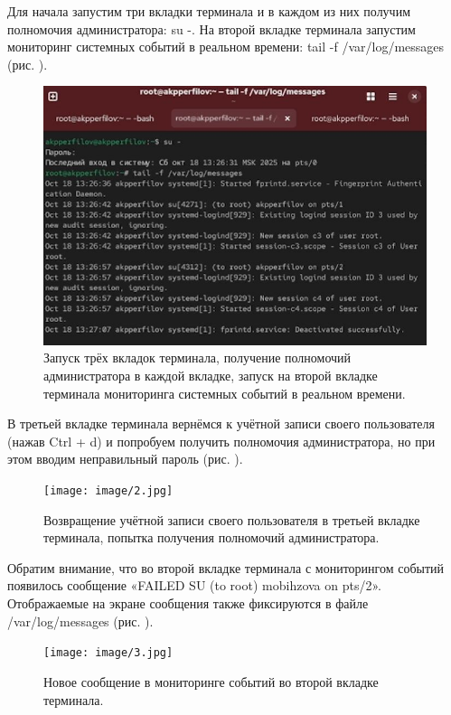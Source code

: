 \documentclass[
  english,
  russian,
  12pt,
  a4paper,
  DIV=11,
  numbers=noendperiod]{scrreprt}
\begin{document}
Для начала запустим три вкладки терминала и в каждом из них получим
полномочия администратора: su -. На второй вкладке терминала запустим
мониторинг системных событий в реальном времени: tail -f
/var/log/messages (рис. \autocite*{fig:001}).

\begin{figure}

{\centering \includegraphics[width=0.71\linewidth,height=\textheight,keepaspectratio]{image/1(1).jpg}

}

\caption{Запуск трёх вкладок терминала, получение полномочий
администратора в каждой вкладке, запуск на второй вкладке терминала
мониторинга системных событий в реальном времени.}

\end{figure}%

В третьей вкладке терминала вернёмся к учётной записи своего
пользователя (нажав Ctrl + d) и попробуем получить полномочия
администратора, но при этом вводим неправильный пароль (рис.
\autocite*{fig:002}).

\begin{figure}

{\centering \texttt{[image: image/2.jpg]}

}

\caption{Возвращение учётной записи своего пользователя в третьей
вкладке терминала, попытка получения полномочий администратора.}

\end{figure}%

Обратим внимание, что во второй вкладке терминала с мониторингом событий
появилось сообщение «FAILED SU (to root) mobihzova on pts/2».
Отображаемые на экране сообщения также фиксируются в файле
/var/log/messages (рис. \autocite*{fig:003}).

\begin{figure}

{\centering \texttt{[image: image/3.jpg]}

}

\caption{Новое сообщение в мониторинге событий во второй вкладке
терминала.}

\end{figure}%
\end{document}
